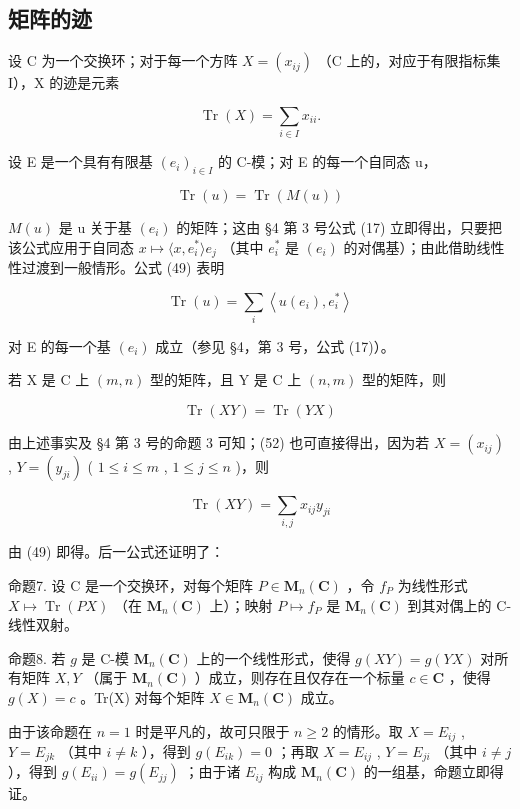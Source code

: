 \subsection{矩阵的迹}

设 C 为一个交换环；对于每一个方阵 \(X = (x_{ij})\) （C 上的，对应于有限指标集 I），X 的迹是元素

\[
\operatorname{Tr} (X) = \sum_ {i \in I} x _ {i i}.\tag{49}
\]

设 E 是一个具有有限基 \((e_{i})_{i\in I}\) 的 C-模；对 E 的每一个自同态 u，

\[
\operatorname{Tr} (u) = \operatorname{Tr} (M (u))\tag{50}
\]

\(M(u)\) 是 u 关于基 \((e_{i})\) 的矩阵；这由 §4 第 3 号公式 (17) 立即得出，只要把该公式应用于自同态 \(x \mapsto \langle x, e_{i}^{*} \rangle e_{j}\) （其中 \(e_{i}^{*}\) 是 \((e_{i})\) 的对偶基）；由此借助线性性过渡到一般情形。公式 (49) 表明

\[
\operatorname{Tr} (u) = \sum_ {i} \left\langle u (e _ {i}), e _ {i} ^ {*} \right\rangle\tag{51}
\]

对 E 的每一个基 \((e_i)\) 成立（参见 §4，第 3 号，公式 (17)）。

若 X 是 C 上 \((m, n)\) 型的矩阵，且 Y 是 C 上 \((n, m)\) 型的矩阵，则

\[
\operatorname{Tr} (X Y) = \operatorname{Tr} (Y X)\tag{52}
\]

由上述事实及 §4 第 3 号的命题 3 可知；(52) 也可直接得出，因为若 \(X = (x_{ij})\) , \(Y = (y_{ji})\) ( \(1 \leqslant i \leqslant m\) , \(1 \leqslant j \leqslant n\) )，则

\[
\operatorname{Tr} (X Y) = \sum_ {i, j} x _ {i j} y _ {j i}\tag{53}
\]

由 (49) 即得。后一公式还证明了：

命题7. 设 C 是一个交换环，对每个矩阵 \(P \in \mathbf{M}_n(\mathbf{C})\) ，令 \(f_P\) 为线性形式 \(X \mapsto \operatorname{Tr}(PX)\) （在 \(\mathbf{M}_n(\mathbf{C})\) 上）；映射 \(P \mapsto f_P\) 是 \(\mathbf{M}_n(\mathbf{C})\) 到其对偶上的 C-线性双射。

命题8. 若 \(g\) 是 C-模 \(\mathbf{M}_n(\mathbf{C})\) 上的一个线性形式，使得 \(g(XY) = g(YX)\) 对所有矩阵 \(X, Y\) （属于 \(\mathbf{M}_n(\mathbf{C})\) ）成立，则存在且仅存在一个标量 \(c \in \mathbf{C}\) ，使得 \(g(X) = c\) 。Tr(X) 对每个矩阵 \(X \in \mathbf{M}_n(\mathbf{C})\) 成立。

由于该命题在 \(n = 1\) 时是平凡的，故可只限于 \(n \geqslant 2\) 的情形。取 \(X = E_{ij}\) , \(Y = E_{jk}\) （其中 \(i \neq k\) ），得到 \(g(E_{ik}) = 0\) ；再取 \(X = E_{ij}\) , \(Y = E_{ji}\) （其中 \(i \neq j\) ），得到 \(g(E_{ii}) = g(E_{jj})\) ；由于诸 \(E_{ij}\) 构成 \(\mathbf{M}_n(\mathbf{C})\) 的一组基，命题立即得证。

